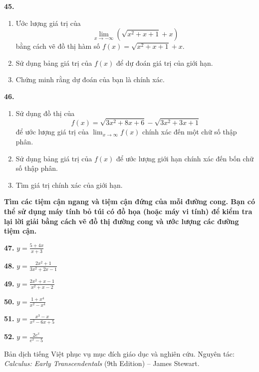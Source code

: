 \begin{minipage}[t]{0.485\textwidth}
\vspace{0.4em}

\noindent\casicon\textbf{45.} 
\begin{enumerate}[label=(\alph*), leftmargin=1.5em, itemsep=1pt, topsep=1pt, parsep=0pt]
    \item Ước lượng giá trị của
    \[
    \lim_{x \to -\infty} \left(\sqrt{x^2 + x + 1} + x\right)
    \]
    bằng cách vẽ đồ thị hàm số $f(x) = \sqrt{x^2 + x + 1} + x$.
    \item Sử dụng bảng giá trị của $f(x)$ để dự đoán giá trị của giới hạn.
    \item Chứng minh rằng dự đoán của bạn là chính xác.
\end{enumerate}

\vspace{0.4em}

\noindent\casicon\textbf{46.} 
\begin{enumerate}[label=(\alph*), leftmargin=1.5em, itemsep=1pt, topsep=1pt, parsep=0pt]
    \item Sử dụng đồ thị của
    \[
    f(x) = \sqrt{3x^2 + 8x + 6} - \sqrt{3x^2 + 3x + 1}
    \]
    để ước lượng giá trị của $\displaystyle \lim_{x \to \infty} f(x)$ chính xác đến một chữ số thập phân.
    \item Sử dụng bảng giá trị của $f(x)$ để ước lượng giới hạn chính xác đến bốn chữ số thập phân.
    \item Tìm giá trị chính xác của giới hạn.
\end{enumerate}

\vspace{0.5em}

\; \textbf{Tìm các tiệm cận ngang và tiệm cận đứng của mỗi đường cong. Bạn có thể sử dụng máy tính bỏ túi có đồ họa (hoặc máy vi tính) để kiểm tra lại lời giải bằng cách vẽ đồ thị đường cong và ước lượng các đường tiệm cận.}

\vspace{0.4em}

\noindent
\parbox[t]{0.48\linewidth}{\textbf{47.} $\displaystyle y = \frac{5 + 4x}{x + 3}$}\hfill
\parbox[t]{0.48\linewidth}{\textbf{48.} $\displaystyle y = \frac{2x^2 + 1}{3x^2 + 2x - 1}$}

\vspace{0.5em}

\noindent
\parbox[t]{0.48\linewidth}{\textbf{49.} $\displaystyle y = \frac{2x^2 + x - 1}{x^2 + x - 2}$}\hfill
\parbox[t]{0.48\linewidth}{\textbf{50.} $\displaystyle y = \frac{1 + x^4}{x^2 - x^4}$}

\vspace{0.5em}

\noindent
\parbox[t]{0.48\linewidth}{\textbf{51.} $\displaystyle y = \frac{x^3 - x}{x^2 - 6x + 5}$}\hfill
\parbox[t]{0.48\linewidth}{\textbf{52.} $\displaystyle y = \frac{2e^x}{e^x - 5}$}

\vspace{0.8em}
\noindent{\color{stewartcyan}\rule{\linewidth}{0.6pt}}

\end{minipage}

\vfill
\begin{center}
{\scriptsize\color{gray} Bản dịch tiếng Việt phục vụ mục đích giáo dục và nghiên cứu. Nguyên tác: \textit{Calculus: Early Transcendentals} (9th Edition) -- James Stewart.}
\end{center}
